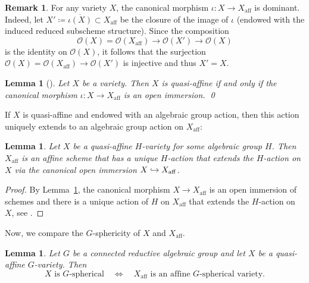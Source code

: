 \documentclass[JEP,XML,SOM,Unicode]{cedram}
\let\mathcal\mathscr
\def\hto{\mathrel{\lhook\joinrel\to}}
\theoremstyle{plain}
\newtheorem{lemma}[theorem]{Lemma}
\theoremstyle{definition}
\newtheorem{remark}[theorem]{Remark}
\DeclareMathOperator{\aff}{aff}
\newcommand{\OO}{\mathcal{O}}
\begin{document}
\begin{remark}
\label{rem.canonical_morphi_dominant}
For any variety $X$, the
canonical morphism $\iota \colon X \to X_{\aff}$ is dominant. Indeed, let
$X' \coloneqq \overline{\iota(X)} \subset X_{\aff}$ be the closure of the image of $\iota$
(endowed with the induced reduced subscheme structure).
Since the composition
\[
\OO(X) = \OO(X_{\aff}) \to \OO(X') \to \OO(X)
\]
is the identity on $\OO(X)$, it follows that the surjection $\OO(X)= \OO(X_{\aff}) \to \OO(X')$
is injective and thus $X' = X$.
\end{remark}

\begin{lemma}[{\cite[\S5, Prop.\,5.1.2]{Gr1961Elements-de-geomet-II}}]
\label{lem:Quasi-affine_irreducible}
Let $X$ be a variety. Then $X$ is quasi-affine if and only if the canonical morphism
$\iota \colon X \to X_{\aff}$ is an open immersion. \qed
\end{lemma}

If $X$ is quasi-affine and endowed with an algebraic group action, then this
action uniquely extends to an algebraic group action on $X_{\aff}$:

\begin{lemma}
\label{lem:Quasi-affine_group_action}
Let $X$ be a quasi-affine $H$-variety for some algebraic group $H$.
Then $X_{\aff}$ is an affine scheme that has a unique
$H$-action that extends the $H$-action on $X$ via the canonical open immersion
$X \hto X_{\aff}$.
\end{lemma}

\begin{proof}
By Lemma~\ref{lem:Quasi-affine_irreducible},
the canonical morphism $X \to X_{\aff}$
is an open immersion of schemes
and there is a unique action of $H$ on $X_{\aff}$ that extends the $H$-action on $X$, see
\eg \cite[Lem.\,5]{KrReSa2018Is-the-affine-spac}.
\end{proof}

Now, we compare the $G$-sphericity of $X$ and $X_{\aff}$.

\begin{lemma}
\label{lem:Spherical_quasi-affine}
Let $G$ be a connected reductive algebraic group and
let $X$ be a quasi-affine $G$-variety. Then
\[
\textrm{$X$ is $G$-spherical} \quad \iff \quad
\textrm{$X_{\aff}$ is an affine $G$-spherical variety}.
\]
\end{lemma}
\end{document}
